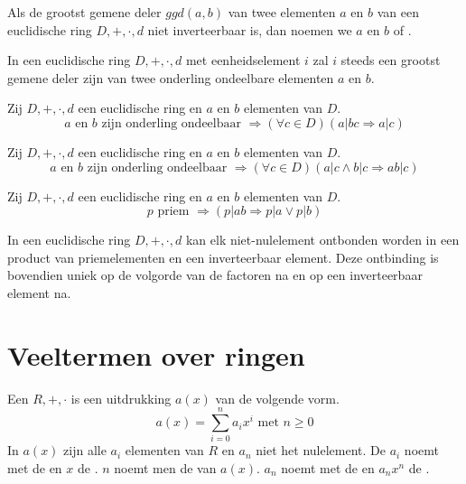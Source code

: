 \documentclass[main.tex]{subfiles}
\begin{document}
\begin{de}
  Als de grootst gemene deler $ggd(a,b)$ van twee elementen $a$ en $b$ van een euclidische ring $D,+,\cdot,d$ niet inverteerbaar is, dan noemen we $a$ en $b$  of .
\end{de}

\begin{ei}
  In een euclidische ring $D,+,\cdot,d$ met eenheidselement $i$ zal $i$ steeds een grootst gemene deler zijn van twee onderling ondeelbare elementen $a$ en $b$.
\end{ei}

\begin{st}
  Zij $D,+,\cdot,d$ een euclidische ring en $a$ en $b$ elementen van $D$.
  \[ a \text{ en } b \text{ zijn onderling ondeelbaar } \Rightarrow (\forall c \in D)(a | bc \Rightarrow a|c) \]
\end{st}

\begin{st}
  Zij $D,+,\cdot,d$ een euclidische ring en $a$ en $b$ elementen van $D$.
  \[ a \text{ en } b \text{ zijn onderling ondeelbaar } \Rightarrow (\forall c \in D)(a | c \wedge b | c \Rightarrow ab|c) \]
\end{st}

\begin{st}
  Zij $D,+,\cdot,d$ een euclidische ring en $a$ en $b$ elementen van $D$.
  \[ p \text{ priem } \Rightarrow (p|ab \Rightarrow p|a \vee p|b) \]
\end{st}

\begin{st}
  In een euclidische ring $D,+,\cdot,d$ kan elk niet-nulelement ontbonden worden in een product van priemelementen en een inverteerbaar element.
  Deze ontbinding is bovendien uniek op de volgorde van de factoren na en op een inverteerbaar element na.
\end{st}

\section{Veeltermen over ringen}
\label{sec:veelt-over-ring}

\begin{de}
  Een  $R,+,\cdot$ is een uitdrukking $a(x)$ van de volgende vorm.
  \[ a(x) = \sum_{i=0}^{n}a_{i}x^{i} \text{ met } n \ge 0 \]
  In $a(x)$ zijn alle $a_{i}$ elementen van $R$ en $a_{n}$ niet het nulelement. 
  De $a_{i}$ noemt met de  en $x$ de .
  $n$ noemt men de  van $a(x)$.
  $a_{n}$ noemt met de  en $a_{n}x^{n}$ de .
\end{de}
\end{document}
